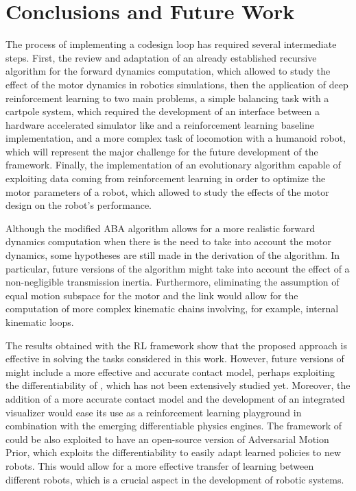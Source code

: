 \chapter{Conclusions and Future Work}
\label{chp:contrib_Conclusions}

The process of implementing a codesign loop has required several intermediate steps. First, the review and adaptation of an already established recursive algorithm for the forward dynamics computation, which allowed to study the effect of the motor dynamics in robotics simulations, then the application of deep reinforcement learning to two main problems, a simple balancing task with a cartpole system, which required the development of an interface between a hardware accelerated simulator like \jaxsim and a reinforcement learning baseline implementation, and a more complex task of locomotion with a humanoid robot, which will represent the major challenge for the future development of the framework. Finally, the implementation of an evolutionary algorithm capable of exploiting data coming from reinforcement learning in order to optimize the motor parameters of a robot, which allowed to study the effects of the motor design on the robot's performance.

Although the modified \ac{ABA} algorithm allows for a more realistic forward dynamics computation when there is the need to take into account the motor dynamics, some hypotheses are still made in the derivation of the algorithm. In particular, future versions of the algorithm might take into account the effect of a non-negligible transmission inertia. Furthermore, eliminating the assumption of equal motion subspace for the motor and the link would allow for the computation of more complex kinematic chains involving, for example, internal kinematic loops.

The results obtained with the \ac{RL} framework show that the proposed approach is effective in solving the tasks considered in this work. However, future versions of \jaxsim might include a more effective and accurate contact model, perhaps exploiting the differentiability of \jax, which has not been extensively studied yet. Moreover, the addition of a more accurate contact model and the development of an integrated visualizer would ease its use as a reinforcement learning playground in combination with the emerging differentiable physics engines.
The framework of \jax could be also exploited to have an open-source version of Adversarial Motion Prior, which exploits the differentiability to easily adapt learned policies to new robots. This would allow for a more effective transfer of learning between different robots, which is a crucial aspect in the development of robotic systems.

